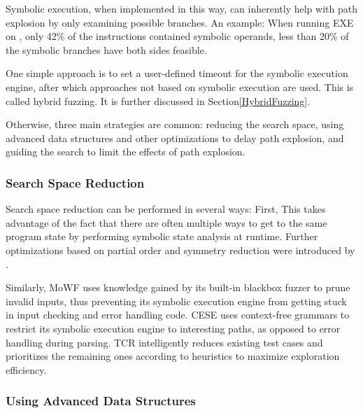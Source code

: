 \documentclass{article}
\begin{document}
\begin{multicols}{2}
    Symbolic execution, when implemented in this way, can inherently help with path explosion by only examining possible branches. An example: When running EXE\cite{EXE} on , only 42\% of the instructions contained symbolic operands, less than 20\% of the symbolic branches have both sides feasible.\cite{EXE}

    One simple approach is to set a user-defined timeout for the symbolic execution engine, after which approaches not based on symbolic execution are used. This is called hybrid fuzzing\cite{HybridFuzzTesting}. It is further discussed in Section\ref{HybridFuzzing}.

    Otherwise, three main strategies are common: reducing the search space, using advanced data structures and other optimizations to delay path explosion, and guiding the search to limit the effects of path explosion.

    \subsubsection{Search Space Reduction}
    Search space reduction can be performed in several ways: First, \cite{RWset} This takes advantage of the fact that there are often multiple ways to get to the same program state by performing symbolic state analysis at runtime. Further optimizations based on partial order and symmetry reduction were introduced by \citeauthor{GSE}.\cite{GSE}

    Similarly, MoWF\cite{MoWF} uses knowledge gained by its built-in blackbox fuzzer to prune invalid inputs, thus preventing its symbolic execution engine from getting stuck in input checking and error handling code. CESE\cite{CESE} uses context-free grammars to restrict its symbolic execution engine to interesting paths, as opposed to error handling during parsing. TCR\cite{TCR} intelligently reduces existing test cases and prioritizes the remaining ones according to heuristics to maximize exploration efficiency.

    \subsubsection{Using Advanced Data Structures}
    \label{AdvancedDataStructures}

\end{multicols}
\end{document}
